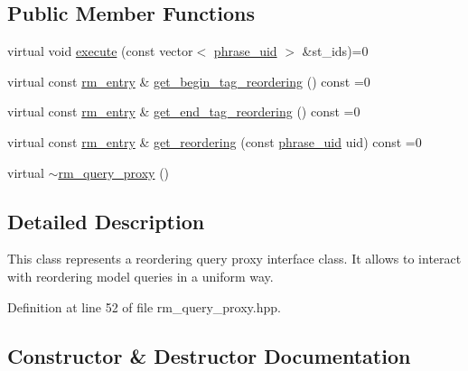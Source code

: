 \subsection*{Public Member Functions}
\begin{DoxyCompactItemize}
\item 
virtual void \hyperlink{classuva_1_1smt_1_1bpbd_1_1server_1_1rm_1_1proxy_1_1rm__query__proxy_a98146bf871df1c1c25ee767a6789b0fd}{execute} (const vector$<$ \hyperlink{namespaceuva_1_1smt_1_1bpbd_1_1server_ad18d4cdf5504e76c22b0c124ff60b44f}{phrase\+\_\+uid} $>$ \&st\+\_\+ids)=0
\item 
virtual const \hyperlink{namespaceuva_1_1smt_1_1bpbd_1_1server_1_1rm_1_1models_a67353bb21590b2a2adf05500899439ed}{rm\+\_\+entry} \& \hyperlink{classuva_1_1smt_1_1bpbd_1_1server_1_1rm_1_1proxy_1_1rm__query__proxy_ad3c21a9dee195e1cd72bed342fcac15f}{get\+\_\+begin\+\_\+tag\+\_\+reordering} () const  =0
\item 
virtual const \hyperlink{namespaceuva_1_1smt_1_1bpbd_1_1server_1_1rm_1_1models_a67353bb21590b2a2adf05500899439ed}{rm\+\_\+entry} \& \hyperlink{classuva_1_1smt_1_1bpbd_1_1server_1_1rm_1_1proxy_1_1rm__query__proxy_a752b935806e2165df1fb95a6fa68d3d0}{get\+\_\+end\+\_\+tag\+\_\+reordering} () const  =0
\item 
virtual const \hyperlink{namespaceuva_1_1smt_1_1bpbd_1_1server_1_1rm_1_1models_a67353bb21590b2a2adf05500899439ed}{rm\+\_\+entry} \& \hyperlink{classuva_1_1smt_1_1bpbd_1_1server_1_1rm_1_1proxy_1_1rm__query__proxy_a16a68e55c35c1cb1a76cb101d01b4558}{get\+\_\+reordering} (const \hyperlink{namespaceuva_1_1smt_1_1bpbd_1_1server_ad18d4cdf5504e76c22b0c124ff60b44f}{phrase\+\_\+uid} uid) const  =0
\item 
virtual \hyperlink{classuva_1_1smt_1_1bpbd_1_1server_1_1rm_1_1proxy_1_1rm__query__proxy_a5eea567e6c06a5aca6c1843fb5a5600f}{$\sim$rm\+\_\+query\+\_\+proxy} ()
\end{DoxyCompactItemize}


\subsection{Detailed Description}
This class represents a reordering query proxy interface class. It allows to interact with reordering model queries in a uniform way. 

Definition at line 52 of file rm\+\_\+query\+\_\+proxy.\+hpp.



\subsection{Constructor \& Destructor Documentation}
\hypertarget{classuva_1_1smt_1_1bpbd_1_1server_1_1rm_1_1proxy_1_1rm__query__proxy_a5eea567e6c06a5aca6c1843fb5a5600f}{}
